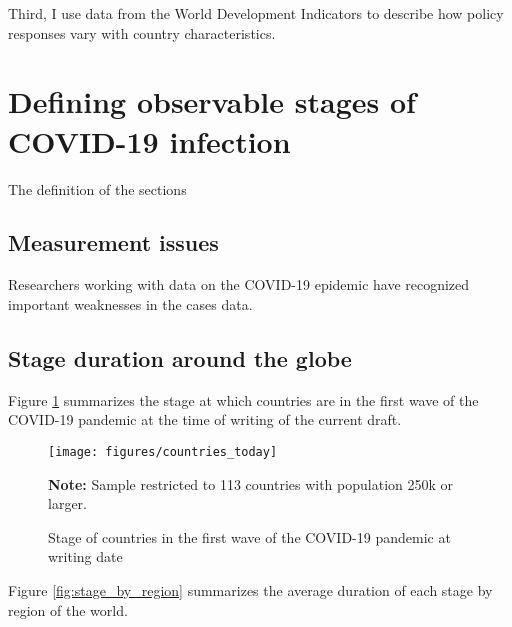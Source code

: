 \documentclass[12pt,english]{article}
\begin{document}
Third, I use data from the World Development Indicators \citep{WorldBank2020} to describe how policy responses vary with country characteristics. 




\section{Defining observable stages of COVID-19 infection\label{sec:Stages}}

The definition of the sections

\subsection{Measurement issues}

Researchers working with data on the COVID-19 epidemic have recognized important weaknesses in the cases data.  

\subsection{Stage duration around the globe}

Figure \ref{fig:current_stage} summarizes the stage at which countries are in the first wave of the COVID-19 pandemic at the time of writing of the current draft.

\begin{figure}[H]
	\singlespacing
	\centering
	 \caption{Stage of countries in the first wave of the COVID-19 pandemic at writing date}  \label{fig:current_stage}
	\resizebox{0.8\width}{!} {
		\begin{threeparttable}

 			  \texttt{[image: figures/countries\_today]}
  			 \begin{tablenotes}[flushleft]\vspace*{-7bp}
			\item \textbf{Note:} Sample restricted to 113 countries with population 250k or larger.
			 \end{tablenotes}
  		\end{threeparttable}
 		}
  	 \onehalfspacing
\end{figure}

Figure \ref{fig:stage_by_region} summarizes the average duration of each stage by region of the world. 
\end{document}
